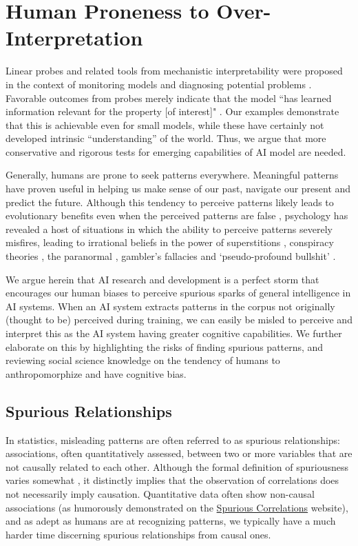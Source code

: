 \section{Human Proneness to Over-Interpretation}\label{social}

Linear probes and related tools from mechanistic interpretability were proposed in the context of monitoring models and diagnosing potential problems \citep{alain2018understanding}. Favorable outcomes from probes merely indicate that the model ``has learned information relevant for the property [of interest]" \citep{belinkov2021probing}. Our examples demonstrate that this is achievable even for small models, while these have certainly not developed intrinsic ``understanding'' of the world. Thus, we argue that more conservative and rigorous tests for emerging capabilities of AI model are needed.

Generally, humans are prone to seek patterns everywhere. Meaningful patterns have proven useful in helping us make sense of our past, navigate our present and predict the future. Although this tendency to perceive patterns likely leads to evolutionary benefits even when the perceived patterns are false \citep{foster2009evolution}, psychology has revealed a host of situations in which the ability to perceive patterns severely misfires, leading to irrational beliefs in the power of superstitions \citep{foster2009evolution}, conspiracy theories \citep{van2018connecting}, the paranormal \citep{muller2023linking}, gambler's fallacies \citep{ladouceur1996erroneous} and `pseudo-profound bullshit' \citep{walker2019finding}. 

We argue herein that AI research and development is a perfect storm that encourages our human biases to perceive spurious sparks of general intelligence in AI systems. When an AI system extracts patterns in the corpus not originally (thought to be) perceived during training, we can easily be misled to perceive and interpret this as the AI system having greater cognitive capabilities. We further elaborate on this by highlighting the risks of finding spurious patterns, and reviewing social science knowledge on the tendency of humans to anthropomorphize and have cognitive bias.

\subsection{Spurious Relationships}
In statistics, misleading patterns are often referred to as spurious relationships: associations, often quantitatively assessed, between two or more variables that are not causally related to each other. Although the formal definition of spuriousness varies somewhat \citep{haig2003spurious}, it distinctly implies that the observation of correlations does not necessarily imply causation. Quantitative data often show non-causal associations (as humorously demonstrated on the \href{http://www.tylervigen.com/spurious-correlations}{Spurious Correlations} website), and as adept as humans are at recognizing patterns, we typically have a much harder time discerning spurious relationships from causal ones. 

